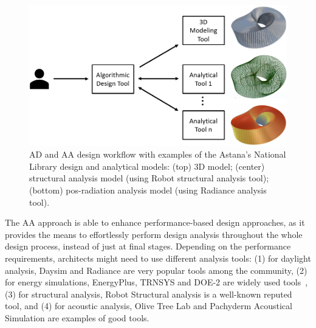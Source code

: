 \begin{figure}[htbp]
\centering
\includegraphics[width=1\textwidth]{./Images/Introduction/AlgorithmicDesignAndAnalysis_w_models2.png}
\caption[General view of the Algorithmic Design and Analysis approach]{\ac{AD} and \ac{AA} design workflow with examples of the Astana's National Library design and analytical models: (top) 3D model; (center) structural analysis model (using Robot structural analysis tool); (bottom) pos-radiation analysis model (using Radiance analysis tool).}
\label{fig:algorithmicanalysis}
\end{figure}		
	
The \ac{AA} approach is able to enhance performance-based design approaches, as it provides the means to effortlessly perform design analysis throughout the whole design process, instead of just at final stages. Depending on the performance requirements, architects might need to use different analysis tools: (1) for daylight analysis, Daysim and Radiance are very popular tools among the community, (2) for energy simulations, EnergyPlus, TRNSYS and DOE-2 are widely used tools~\cite{Nguyen2014}, (3) for structural analysis, Robot Structural analysis is a well-known reputed tool, and (4) for acoustic analysis, Olive Tree Lab and Pachyderm Acoustical Simulation are examples of good tools.%

